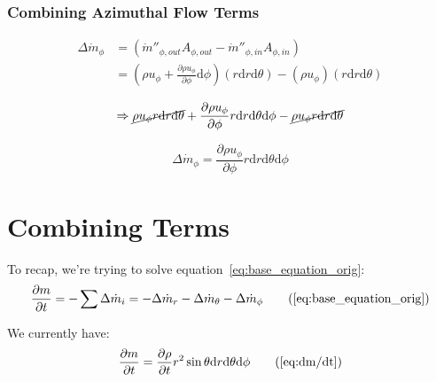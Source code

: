 \documentclass[12pt, letterpaper, twoside]{article}
\begin{document}
        \subsubsection{Combining Azimuthal Flow Terms}
            \begin{equation*}
            \begin{split}
                \Delta\dot{m}_{\phi} & = (\dot{m}''_{\phi,out} A_{\phi,out} - \dot{m}''_{\phi,in} A_{\phi,in}) \\
                & = \left( \rho u_{\phi}  + \frac{\partial \rho u_{\phi}}{\partial \phi} \textrm{d}\phi \right)
                \left(r \textrm{d}r \textrm{d}\theta \right) -
                \left(\rho u_{\phi} \right) \left(r \textrm{d}r \textrm{d}\theta \right)
            \end{split}
            \end{equation*}

            \begin{equation*}
                \Rightarrow
                \cancel{\rho u_\phi r \textrm{d}r \textrm{d}\theta} + \frac{\partial \rho u_{\phi}}{\partial \phi} r \textrm{d}r \textrm{d}\theta \textrm{d}\phi -
                \cancel{\rho u_\phi r \textrm{d}r \textrm{d}\theta} 
            \end{equation*}

            \begin{equation}\label{eq:mdotphi}
                \boxed{\Delta\dot{m}_{\phi} = \frac{\partial \rho u_{\phi}}{\partial \phi} r \textrm{d}r \textrm{d}\theta \textrm{d}\phi }
            \end{equation}


\section{Combining Terms}\label{sect:combineterms}
To recap, we're trying to solve equation~\ref{eq:base_equation_orig}:
    \begin{equation}
        \frac{\partial m}{\partial t} = - \sum \Delta\dot{m}_i = -\Delta\dot{m}_r - \Delta\dot{m}_{\theta} - \Delta\dot{m}_{\phi} 
        \tag{\ref{eq:base_equation_orig}}
    \end{equation}

We currently have:
    \begin{equation}
        \frac{\partial m}{\partial t} = 
        \frac{\partial \rho}{\partial t} r^2 \sin\theta \textrm{d}r \textrm{d}\theta \textrm{d}\phi
        \tag{\ref{eq:dm/dt}}
    \end{equation}
\end{document}
